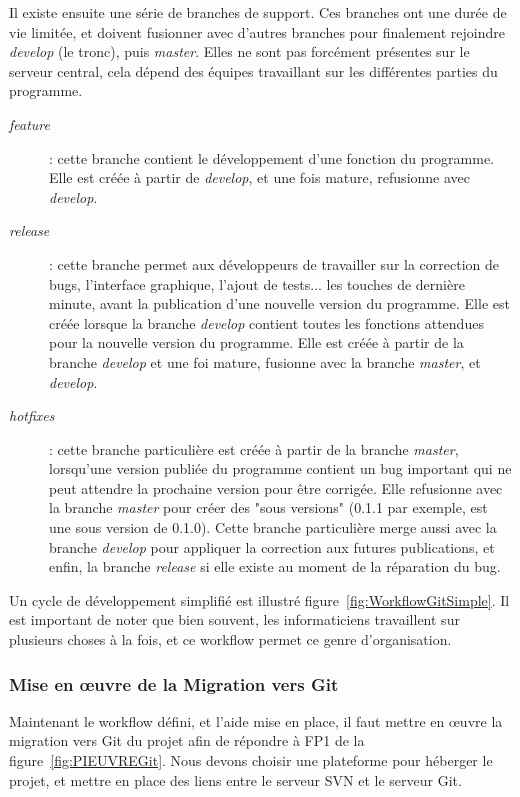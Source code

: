 Il existe ensuite une série de branches de support.
Ces branches ont une durée de vie limitée, et doivent fusionner avec d'autres branches pour finalement rejoindre \emph{develop} (le tronc), puis \emph{master}.
Elles ne sont pas forcément présentes sur le serveur central, cela dépend des équipes travaillant sur les différentes parties du programme.
\begin{description}
  \item[\emph{feature}] : cette branche contient le développement d'une fonction du programme. Elle est créée à partir de \emph{develop}, et une fois mature, refusionne avec \emph{develop}.
  \item[\emph{release}] : cette branche permet aux développeurs de travailler sur la correction de bugs, l'interface graphique, l'ajout de tests... les touches de dernière minute, avant la publication d'une nouvelle version du programme. Elle est créée lorsque la branche \emph{develop} contient toutes les fonctions attendues pour la nouvelle version du programme. Elle est créée à partir de la branche \emph{develop} et une foi mature, fusionne avec la branche \emph{master}, et \emph{develop}.
  \item[\emph{hotfixes}] : cette branche particulière est créée à partir de la branche \emph{master}, lorsqu'une version publiée du programme contient un bug important qui ne peut attendre la prochaine version pour être corrigée. Elle refusionne avec la branche \emph{master} pour créer des "sous versions" (0.1.1 par exemple, est une sous version de 0.1.0). Cette branche particulière merge aussi avec la branche \emph{develop} pour appliquer la correction aux futures publications, et enfin, la branche \emph{release} si elle existe au moment de la réparation du bug.
\end{description}

Un cycle de développement simplifié est illustré figure~\ref{fig:WorkflowGitSimple}.
Il est important de noter que bien souvent, les informaticiens travaillent sur plusieurs choses à la fois,
et ce workflow permet ce genre d'organisation. 

\subsubsection{Mise en œuvre de la Migration vers Git}

Maintenant le workflow défini, et l'aide mise en place, il faut mettre en œuvre la migration vers Git du projet afin de répondre à FP1 de la figure~\ref{fig:PIEUVREGit}. Nous devons choisir une plateforme pour héberger le projet, et mettre en place des liens entre le serveur SVN et le serveur Git.

